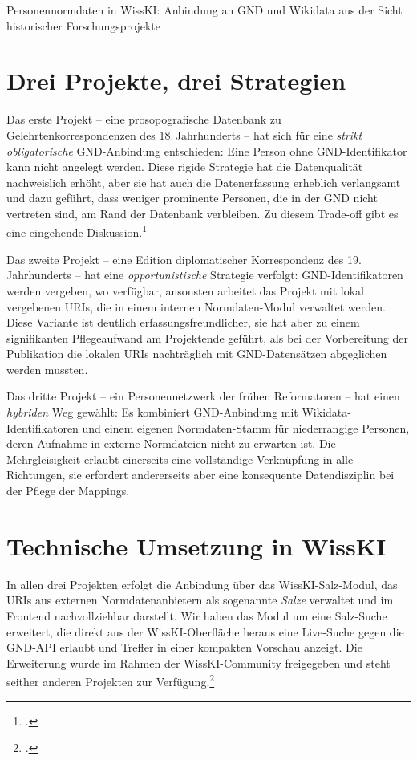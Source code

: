 \begin{beitrag}{Personennormdaten in WissKI: Anbindung an GND und Wikidata aus der Sicht historischer Forschungsprojekte}
\section{Drei Projekte, drei Strategien}
Das erste Projekt -- eine prosopografische Datenbank zu Gelehrtenkorrespondenzen des 18.\,Jahrhunderts -- hat sich für eine \emph{strikt obligatorische} GND-Anbindung entschieden: Eine Person ohne GND-Identifikator kann nicht angelegt werden. Diese rigide Strategie hat die Datenqualität nachweislich erhöht, aber sie hat auch die Datenerfassung erheblich verlangsamt und dazu geführt, dass weniger prominente Personen, die in der GND nicht vertreten sind, am Rand der Datenbank verbleiben. Zu diesem Trade-off gibt es eine eingehende Diskussion.\footcite[83]{krueger2024-gnd-pflicht}

Das zweite Projekt -- eine Edition diplomatischer Korrespondenz des 19.\,Jahrhunderts -- hat eine \emph{opportunistische} Strategie verfolgt: GND-Identifikatoren werden vergeben, wo verfügbar, ansonsten arbeitet das Projekt mit lokal vergebenen URIs, die in einem internen Normdaten-Modul verwaltet werden. Diese Variante ist deutlich erfassungsfreundlicher, sie hat aber zu einem signifikanten Pflegeaufwand am Projektende geführt, als bei der Vorbereitung der Publikation die lokalen URIs nachträglich mit GND-Datensätzen abgeglichen werden mussten.

Das dritte Projekt -- ein Personennetzwerk der frühen Reformatoren -- hat einen \emph{hybriden} Weg gewählt: Es kombiniert GND-Anbindung mit Wikidata-Identifikatoren und einem eigenen Normdaten-Stamm für niederrangige Personen, deren Aufnahme in externe Normdateien nicht zu erwarten ist. Die Mehrgleisigkeit erlaubt einerseits eine vollständige Verknüpfung in alle Richtungen, sie erfordert andererseits aber eine konsequente Datendisziplin bei der Pflege der Mappings.

\section{Technische Umsetzung in WissKI}
In allen drei Projekten erfolgt die Anbindung über das WissKI-Salz-Modul, das URIs aus externen Normdatenanbietern als sogenannte \emph{Salze} verwaltet und im Frontend nachvollziehbar darstellt. Wir haben das Modul um eine Salz-Suche erweitert, die direkt aus der WissKI-Oberfläche heraus eine Live-Suche gegen die GND-API erlaubt und Treffer in einer kompakten Vorschau anzeigt. Die Erweiterung wurde im Rahmen der WissKI-Community freigegeben und steht seither anderen Projekten zur Verfügung.\footcite[vgl.][210]{lehmann2025-salz-modul}


\end{beitrag}
